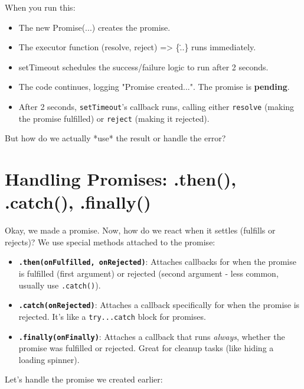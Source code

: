 \documentclass[12pt,letterpaper]{article}
\begin{document}
When you run this:
\begin{itemize}
    \item The \textcolor{accentColor}{new Promise(...)} creates the promise.
    \item The executor function \textcolor{accentColor}{(resolve, reject) => \{\...\}} runs immediately.
    \item \textcolor{accentColor}{setTimeout} schedules the success/failure logic to run after 2 seconds.
    \item The code continues, logging "Promise created...". The promise is \textbf{pending}.
    \item After 2 seconds, \texttt{\textcolor{accentColor}{setTimeout}}'s callback runs, calling either \texttt{\textcolor{accentColor}{resolve}} (making the promise fulfilled) or \texttt{\textcolor{accentColor}{reject}} (making it rejected).
\end{itemize}

But how do we actually *use* the result or handle the error?

\section{Handling Promises: \textcolor{accentColor}{.then()}, \textcolor{accentColor}{.catch()}, \textcolor{accentColor}{.finally()}}

Okay, we made a promise. Now, how do we react when it settles (fulfills or rejects)? We use special methods attached to the promise:

\begin{itemize}
    \item \texttt{\textbf{\textcolor{accentColor}{.then(onFulfilled, onRejected)}}}: Attaches callbacks for when the promise is fulfilled (first argument) or rejected (second argument - less common, usually use \texttt{\textcolor{accentColor}{.catch()}}).
    \item \texttt{\textbf{\textcolor{accentColor}{.catch(onRejected)}}}: Attaches a callback specifically for when the promise is rejected. It's like a \texttt{\textcolor{accentColor}{try...catch}} block for promises.
    \item \texttt{\textbf{\textcolor{accentColor}{.finally(onFinally)}}}: Attaches a callback that runs \textit{always}, whether the promise was fulfilled or rejected. Great for cleanup tasks (like hiding a loading spinner).
\end{itemize}

Let's handle the promise we created earlier:
\end{document}

